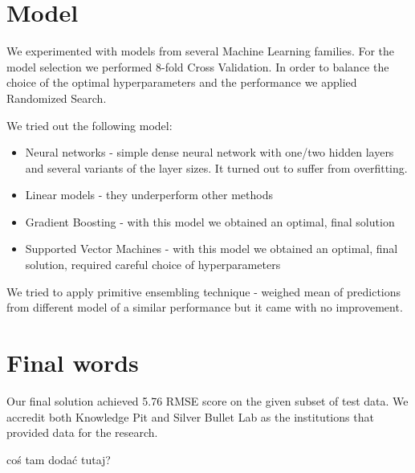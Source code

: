 \documentclass[a4paper]{article}
\begin{document}
\section{Model}
We experimented with models from several Machine Learning families.
For the model selection we performed 8-fold Cross Validation. 
In order to balance the choice of the optimal hyperparameters and the performance we applied Randomized Search.

We tried out the following model:
\begin{itemize}
\item Neural networks - simple dense neural network with one/two hidden layers and several variants of the layer sizes. It turned out to suffer from overfitting.
\item Linear models - they underperform other methods
\item Gradient Boosting - with this model we obtained an optimal, final solution %
\item Supported Vector Machines - with this model we obtained an optimal, final solution, required careful choice of hyperparameters
\end{itemize}



We tried to apply primitive ensembling technique - weighed mean of predictions from different model of a similar performance but it came with no improvement.

\section{Final words}
Our final solution achieved 5.76 RMSE score on the given subset of test data. We accredit both Knowledge Pit and Silver Bullet Lab as the institutions that provided data for the research.

\begin{thebibliography}{9}
  coś tam dodać tutaj?

\end{thebibliography}
\end{document}
